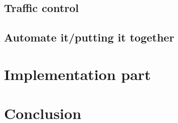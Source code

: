\documentclass[
  master,
  biblatex,
  glossaries,
  index
]{kidiplom}
\begin{document}

\subsection{Traffic control}


\subsection{Automate it/putting it together}


\section{Implementation part}


\section{Conclusion}


\printbibliography
\end{document}

